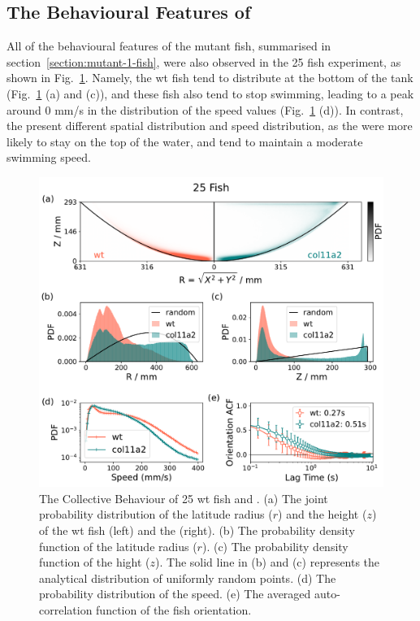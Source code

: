 \documentclass[11pt,twoside]{report}
\begin{document}
\subsection{The Behavioural Features of {\mf}}
\label{section:mutant-feature-many}


All of the behavioural features of the mutant fish, summarised in section~\ref{section:mutant-1-fish}, were also observed in the 25 fish experiment, as shown in Fig.~\ref{fig:mutant-25}.
Namely, the wt fish tend to distribute at the bottom of the tank (Fig.~\ref{fig:mutant-25} (a) and (c)), and these fish also tend to stop swimming, leading to a peak around 0 mm/s in the distribution of the speed values (Fig.~\ref{fig:mutant-25} (d)).
In contrast, the {\mf} present different spatial distribution and speed distribution, as the {\mf} were more likely to stay on the top of the water, and tend to maintain a moderate swimming speed.

\begin{figure}
	\includegraphics[width=\linewidth]{behaviour-25}
	\caption[The Collective Behaviour of 25 wt fish and {\mf}.]{
        The Collective Behaviour of 25 wt fish and {\mf}.
        (a) The joint probability distribution of the latitude radius ($r$) and the height ($z$) of the wt fish (left) and the {\mf} (right).
        (b) The probability density function of the latitude radius ($r$).
        (c) The probability density function of the hight ($z$).
        The solid line in (b) and (c) represents the analytical distribution of uniformly random points.
        (d) The probability distribution of the speed.
        (e) The averaged auto-correlation function of the fish orientation.
    }
\label{fig:mutant-25}
\end{figure}
\end{document}
